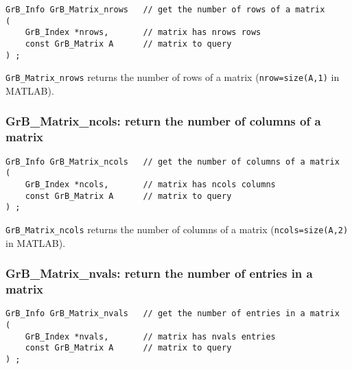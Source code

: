 \documentclass[12pt]{article}
\begin{document}
\begin{mdframed}[userdefinedwidth=6in]
{\footnotesize
\begin{verbatim}
GrB_Info GrB_Matrix_nrows   // get the number of rows of a matrix
(
    GrB_Index *nrows,       // matrix has nrows rows
    const GrB_Matrix A      // matrix to query
) ;
\end{verbatim} } \end{mdframed}

\verb'GrB_Matrix_nrows' returns the number of rows of a matrix
(\verb'nrow=size(A,1)' in MATLAB).

\subsubsection{{\sf GrB\_Matrix\_ncols:}        return the number of columns of a matrix}
\label{matrix_ncols}

\begin{mdframed}[userdefinedwidth=6in]
{\footnotesize
\begin{verbatim}
GrB_Info GrB_Matrix_ncols   // get the number of columns of a matrix
(
    GrB_Index *ncols,       // matrix has ncols columns
    const GrB_Matrix A      // matrix to query
) ;
\end{verbatim}
} \end{mdframed}

\verb'GrB_Matrix_ncols' returns the number of columns of a matrix
(\verb'ncols=size(A,2)' in MATLAB).

\subsubsection{{\sf GrB\_Matrix\_nvals:}        return the number of entries in a matrix}
\label{matrix_nvals}

\begin{mdframed}[userdefinedwidth=6in]
{\footnotesize
\begin{verbatim}
GrB_Info GrB_Matrix_nvals   // get the number of entries in a matrix
(
    GrB_Index *nvals,       // matrix has nvals entries
    const GrB_Matrix A      // matrix to query
) ;
\end{verbatim} } \end{mdframed}
\end{document}
